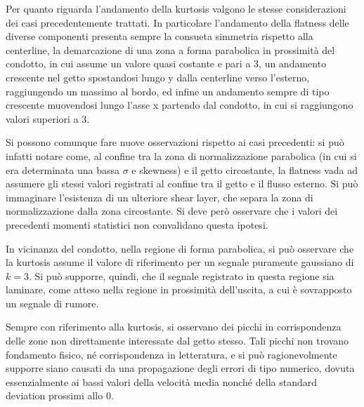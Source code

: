 \documentclass{article} %
\begin{document}
Per quanto riguarda l'andamento della kurtosis valgono le stesse considerazioni dei casi precedentemente trattati. In particolare l'andamento della flatness delle diverse componenti presenta sempre la consueta simmetria rispetto alla centerline, la demarcazione di una zona a forma parabolica in prossimità del condotto, in cui assume un valore quasi costante e pari a 3, un andamento crescente nel getto spostandosi lungo y dalla centerline verso l'esterno, raggiungendo un massimo al bordo, ed infine un andamento sempre di tipo crescente muovendosi lungo l'asse x partendo dal condotto, in cui si raggiungono valori superiori a 3.\par
Si possono comunque fare nuove osservazioni rispetto ai casi precedenti: si può infatti notare come, al confine tra la zona di normalizzazione parabolica (in cui si era determinata una bassa $\sigma$ e skewness) e il getto circostante, la flatness vada ad assumere gli stessi valori registrati al confine tra il getto e il flusso esterno.  Si può immaginare l'esistenza di un ulteriore shear layer, che separa la zona di normalizzazione dalla zona circostante. Si deve però osservare che i valori dei precedenti momenti statistici non convalidano questa ipotesi.\par
In vicinanza del condotto, nella regione di forma parabolica, si può osservare che la kurtosis assume il valore di riferimento per un segnale puramente gaussiano di $k = 3$. Si può supporre, quindi, che il segnale registrato in questa regione sia laminare, come atteso nella regione in prossimità dell'uscita, a cui è sovrapposto un segnale di rumore.\par
Sempre con riferimento alla kurtosis, si osservano dei picchi in corrispondenza delle zone non direttamente interessate dal getto stesso. Tali picchi non trovano fondamento fisico, né corrispondenza in letteratura, e si può ragionevolmente supporre siano causati da una propagazione degli errori di tipo numerico, dovuta essenzialmente ai bassi valori della velocità media nonché della standard deviation prossimi allo 0.
\clearpage   
\end{document}
